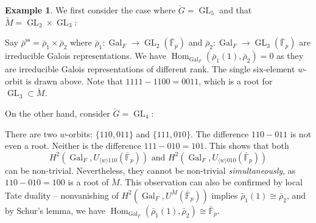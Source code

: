 \documentclass[11pt]{amsart}
\newcommand{\MINOREDITED}[1]{#1}
\theoremstyle{definition}
\newtheorem{example}[thm]{Example}
\renewcommand{\SS}{{\operatorname{ss}}}
\newcommand{\bFp}{\bar{\mathbb{F}}_p}
\newcommand{\bG}{\breve{G}}
\newcommand{\bM}{\breve{M}}
\DeclareMathOperator{\GL}{GL}
\DeclareMathOperator{\Hom}{Hom}
\DeclareMathOperator{\Gal}{Gal}
\begin{document}
\begin{example}
We first consider the case where $\bG=\GL_5$
and that $\bM=\GL_2\times \GL_3$:

\blockFive

\noindent
Say $\bar\rho^\SS=\bar\rho_1\times \bar\rho_2$
where $\bar\rho_1:\Gal_F\to \GL_2(\bFp)$
and $\bar\rho_2:\Gal_F\to \GL_3(\bFp)$
are irreducible Galois representations.
We have
$\Hom_{\Gal_F}(\bar\rho_1(1), \bar\rho_2)=0$
as they are irreducible Galois representations
of different rank.
The single six-element $w$-orbit is drawn above.
Note that $1111-1100=0011$, which is a root
for $\GL_3\subset\bM$.

On the other hand, consider $\bG=\GL_4$:


\noindent
There are two $w$-orbits:
$\{110,011\}$ and $\{111,010\}$.
The difference $110-011$ is not even a root.
Neither is the difference $111-010=101$.
This shows that both
\[
H^2(\Gal_F, U_{\langle w\rangle 110}(\bFp))
\text{~and~}
H^2(\Gal_F, U_{\langle w\rangle 010}(\bFp))
\]
can be non-trivial.
Nevertheless, they cannot be \MINOREDITED{non-trivial} {\it simultaneously},
as $110-010=100$ is a root of $\bM$.
This observation can also be confirmed by
local Tate duality --
nonvanishing of $H^2(\Gal_F, U^{\bM}(\bFp))$
\MINOREDITED{implies} $\bar\rho_1(1)\cong \bar\rho_2$,
and by Schur's lemma, we have
$\Hom_{\Gal_F}(\bar\rho_1(1), \bar\rho_2)\cong\bFp$.
\end{example}
\end{document}
